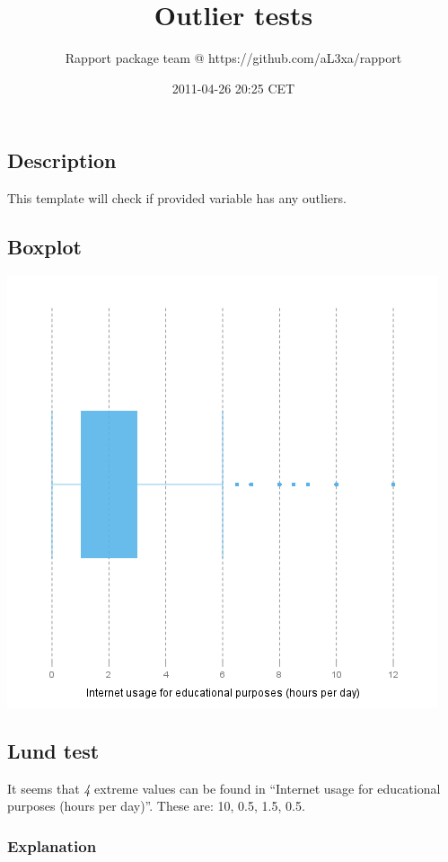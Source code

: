 \documentclass[]{article}
\title{Outlier tests}
\author{Rapport package team @ https://github.com/aL3xa/rapport}
\date{2011-04-26 20:25 CET}
\makeatletter
\def\maxwidth{\ifdim\Gin@nat@width>\linewidth\linewidth
\else\Gin@nat@width\fi}
\let\Oldincludegraphics\includegraphics
\renewcommand{\includegraphics}[1]{\Oldincludegraphics[width=\maxwidth]{#1}}
\makeatother
\begin{document}
\maketitle

\subsection{Description}

This template will check if provided variable has any outliers.

\subsection{Boxplot}

\href{ea1797865a9d9a619be0e9c5d55d5de7-hires.png}{\includegraphics{ea1797865a9d9a619be0e9c5d55d5de7.png}}

\subsection{Lund test}

It seems that \emph{4} extreme values can be found in ``Internet usage
for educational purposes (hours per day)''. These are: 10, 0.5, 1.5,
0.5.

\subsubsection{Explanation}
\end{document}
